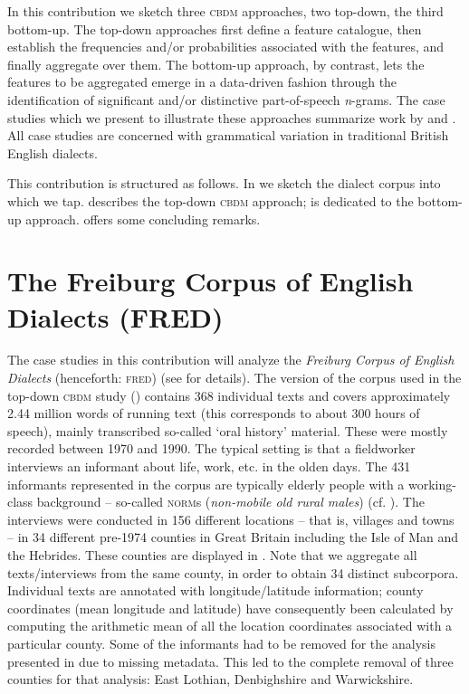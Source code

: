 \documentclass[output=paper]{LSP/langsci}
\begin{document}
In this contribution we sketch three \textsc{cbdm} approaches, two top-down, the third bottom-up. The top-down approaches first define a feature catalogue, then establish the frequencies and/or probabilities associated with the features, and finally aggregate over them. The bottom-up approach, by contrast, lets the features to be aggregated emerge in a data-driven fashion through the identification of significant and/or distinctive part-of-speech \emph{n}-grams. The case studies which we present to illustrate these approaches summarize work by \citet{szmrecsanyi_grammatical_2013} and \citet{wolk_integrating_2014}. All case studies are concerned with grammatical variation in traditional British English dialects.

\largerpage
This contribution is structured as follows. In  we sketch the dialect corpus into which we tap.  describes the top-down \textsc{cbdm} approach;  is dedicated to the bottom-up approach.  offers some concluding remarks.


\section{The Freiburg Corpus of English Dialects (FRED)}\label{FRED}

The case studies in this contribution will analyze the \emph{Freiburg Corpus of English Dialects} (henceforth: \textsc{fred}) (see \citealt{hernandez_users_2006} for details). 
The version of the corpus used in the top-down \textsc{cbdm} study () contains 368 individual texts and covers approximately 2.44 million words of running text (this corresponds to about 300 hours of speech), mainly transcribed so-called `oral history' material. 
These were mostly recorded between 1970 and 1990. 
The typical setting is that a fieldworker interviews an informant about life, work, etc. in the olden days. 
The 431 informants represented in the corpus are typically elderly people with a working-class background -- so-called \textsc{norm}s (\emph{non-mobile old rural males}) (cf. \citealt[29]{chambers_dialectology_1998}). 
The interviews were conducted in 156 different locations -- that is, villages and towns -- in 34 different pre-1974 counties in Great Britain including the Isle of Man and the Hebrides. These counties are displayed in  . 
Note that we aggregate all texts/interviews from the same county, in order to obtain 34 distinct subcorpora.
Individual texts are annotated with longitude/latitude information; county coordinates (mean longitude and latitude) have consequently been calculated by computing the arithmetic mean of all the location coordinates associated with a particular county. 
Some of the informants had to be removed for the analysis presented in  due to missing metadata.
This led to the complete removal of three counties for that analysis: East Lothian, Denbighshire and Warwickshire.
\end{document}
